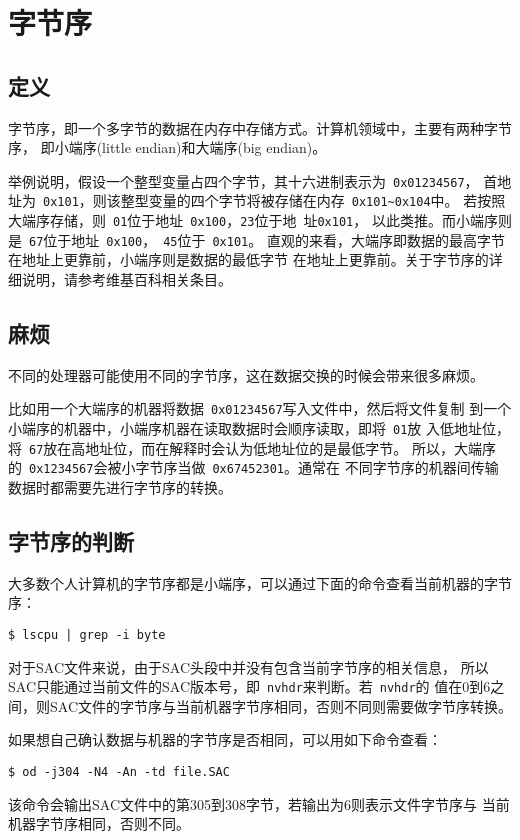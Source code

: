 \section{字节序}
\subsection{定义}
字节序，即一个多字节的数据在内存中存储方式。计算机领域中，主要有两种字节序，
即小端序(little endian)和大端序(big endian)。

举例说明，假设一个整型变量占四个字节，其十六进制表示为~\verb+0x01234567+，
首地址为~\verb+0x101+，则该整型变量的四个字节将被存储在内存~\verb+0x101~0x104+中。
若按照大端序存储，则~\verb+01+位于地址~\verb+0x100+，\verb+23+位于地~址\verb+0x101+，
以此类推。而小端序则是~\verb+67+位于地址~\verb+0x100+，~\verb+45+位于~\verb+0x101+。
直观的来看，大端序即数据的最高字节在地址上更靠前，小端序则是数据的最低字节
在地址上更靠前。关于字节序的详细说明，请参考维基百科相关条目。

\subsection{麻烦}
不同的处理器可能使用不同的字节序，这在数据交换的时候会带来很多麻烦。

比如用一个大端序的机器将数据~\verb+0x01234567+写入文件中，然后将文件复制
到一个小端序的机器中，小端序机器在读取数据时会顺序读取，即将~\verb+01+放
入低地址位，将~\verb+67+放在高地址位，而在解释时会认为低地址位的是最低字节。
所以，大端序的~\verb+0x1234567+会被小字节序当做~\verb+0x67452301+。通常在
不同字节序的机器间传输数据时都需要先进行字节序的转换。

\subsection{字节序的判断}
大多数个人计算机的字节序都是小端序，可以通过下面的命令查看当前机器的字节序：
\begin{verbatim}
$ lscpu | grep -i byte
\end{verbatim}

对于SAC文件来说，由于SAC头段中并没有包含当前字节序的相关信息，
所以SAC只能通过当前文件的SAC版本号，即~\verb+nvhdr+来判断。若~\verb+nvhdr+的
值在0到6之间，则SAC文件的字节序与当前机器字节序相同，否则不同则需要做字节序转换。

如果想自己确认数据与机器的字节序是否相同，可以用如下命令查看：
\begin{verbatim}
$ od -j304 -N4 -An -td file.SAC
\end{verbatim}
该命令会输出SAC文件中的第305到308字节，若输出为6则表示文件字节序与
当前机器字节序相同，否则不同。

